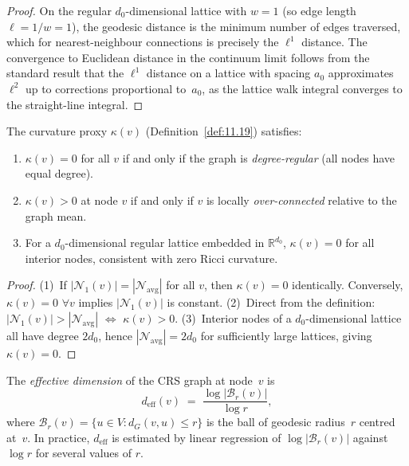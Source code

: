 \begin{proof}
On the regular $d_0$-dimensional lattice with $w = 1$ (so edge
length $\ell = 1/w = 1$), the geodesic distance is the minimum number
of edges traversed, which for nearest-neighbour connections is
precisely the $\ell^1$ distance.  The convergence to Euclidean
distance in the continuum limit follows from the standard result
that the $\ell^1$ distance on a lattice with spacing $a_0$
approximates $\ell^2$ up to corrections proportional to~$a_0$,
as the lattice walk integral converges to the straight-line
integral.
\end{proof}

\begin{theorem}
\label{thm:11.5}
The curvature proxy $\kappa(v)$ (Definition~\ref{def:11.19}) satisfies:
\begin{enumerate}
  \item $\kappa(v) = 0$ for all $v$ if and only if the graph is
    \emph{degree-regular} (all nodes have equal degree).
  \item $\kappa(v) > 0$ at node $v$ if and only if $v$ is locally
    \emph{over-connected} relative to the graph mean.
  \item For a $d_0$-dimensional regular lattice embedded in
    $\mathbb{R}^{d_0}$, $\kappa(v) = 0$ for all interior nodes,
    consistent with zero Ricci curvature.
\end{enumerate}
\end{theorem}

\begin{proof}
(1)~If $|\mathcal{N}_1(v)| = |\mathcal{N}_{\mathrm{avg}}|$ for all
$v$, then $\kappa(v) = 0$ identically.  Conversely, $\kappa(v) = 0$
$\forall v$ implies $|\mathcal{N}_1(v)|$ is constant.
(2)~Direct from the definition: $|\mathcal{N}_1(v)| >
|\mathcal{N}_{\mathrm{avg}}|$ $\Leftrightarrow$ $\kappa(v) > 0$.
(3)~Interior nodes of a $d_0$-dimensional lattice all have degree
$2d_0$, hence $|\mathcal{N}_{\mathrm{avg}}| = 2d_0$ for sufficiently
large lattices, giving $\kappa(v) = 0$.
\end{proof}

\begin{definition}
\label{def:11.20}
The \emph{effective dimension} of the CRS graph at node~$v$ is
\begin{equation}
\label{eq:11.dimension}
  d_{\mathrm{eff}}(v) \;=\;
  \frac{\log |\mathcal{B}_r(v)|}{\log r},
\end{equation}
where $\mathcal{B}_r(v) = \{u \in V : d_G(v, u) \leq r\}$ is the
ball of geodesic radius~$r$ centred at~$v$.  In practice, $d_{\mathrm{eff}}$
is estimated by linear regression of $\log |\mathcal{B}_r(v)|$
against $\log r$ for several values of $r$.
\end{definition}

